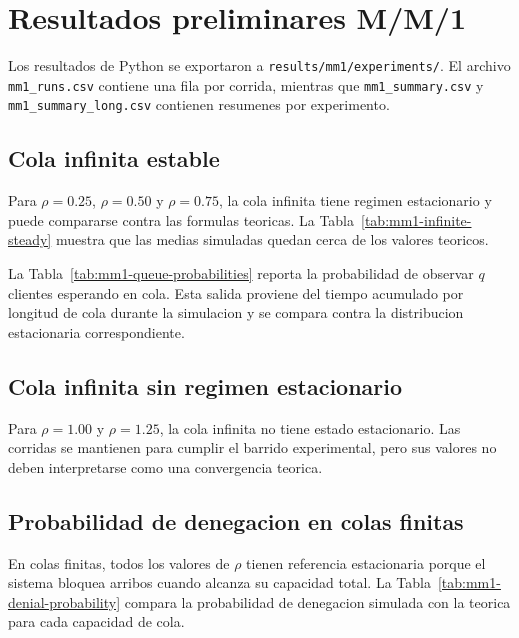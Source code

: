 \section{Resultados preliminares M/M/1}

Los resultados de Python se exportaron a \texttt{results/mm1/experiments/}. El archivo \texttt{mm1\_runs.csv} contiene una fila por corrida, mientras que \texttt{mm1\_summary.csv} y \texttt{mm1\_summary\_long.csv} contienen resumenes por experimento.

\subsection{Cola infinita estable}

Para $\rho=0.25$, $\rho=0.50$ y $\rho=0.75$, la cola infinita tiene regimen estacionario y puede compararse contra las formulas teoricas. La Tabla~\ref{tab:mm1-infinite-steady} muestra que las medias simuladas quedan cerca de los valores teoricos.



La Tabla~\ref{tab:mm1-queue-probabilities} reporta la probabilidad de observar $q$ clientes esperando en cola. Esta salida proviene del tiempo acumulado por longitud de cola durante la simulacion y se compara contra la distribucion estacionaria correspondiente.



\subsection{Cola infinita sin regimen estacionario}

Para $\rho=1.00$ y $\rho=1.25$, la cola infinita no tiene estado estacionario. Las corridas se mantienen para cumplir el barrido experimental, pero sus valores no deben interpretarse como una convergencia teorica.



\subsection{Probabilidad de denegacion en colas finitas}

En colas finitas, todos los valores de $\rho$ tienen referencia estacionaria porque el sistema bloquea arribos cuando alcanza su capacidad total. La Tabla~\ref{tab:mm1-denial-probability} compara la probabilidad de denegacion simulada con la teorica para cada capacidad de cola.

